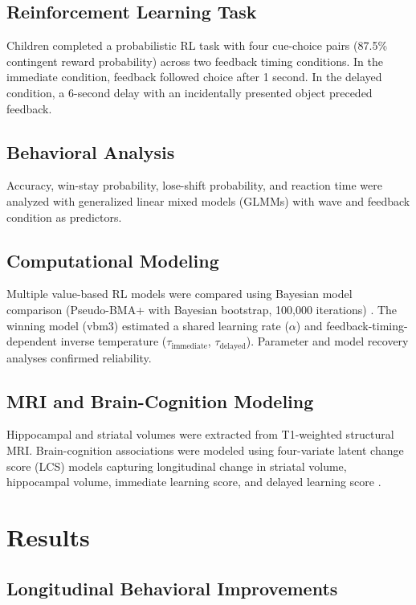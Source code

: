 \documentclass[12pt]{article}
\begin{document}
\subsection{Reinforcement Learning Task}

Children completed a probabilistic RL task with four cue-choice pairs (87.5\% contingent reward probability) across two feedback timing conditions. In the immediate condition, feedback followed choice after 1 second. In the delayed condition, a 6-second delay with an incidentally presented object preceded feedback.

\subsection{Behavioral Analysis}

Accuracy, win-stay probability, lose-shift probability, and reaction time were analyzed with generalized linear mixed models (GLMMs) with wave and feedback condition as predictors.

\subsection{Computational Modeling}

Multiple value-based RL models were compared using Bayesian model comparison (Pseudo-BMA+ with Bayesian bootstrap, 100,000 iterations) \citep{yao2017pseudobma, daw2011trial}. The winning model (vbm3) estimated a shared learning rate ($\alpha$) and feedback-timing-dependent inverse temperature ($\tau_\text{immediate}$, $\tau_\text{delayed}$). Parameter and model recovery analyses confirmed reliability.

\subsection{MRI and Brain-Cognition Modeling}

Hippocampal and striatal volumes were extracted from T1-weighted structural MRI. Brain-cognition associations were modeled using four-variate latent change score (LCS) models capturing longitudinal change in striatal volume, hippocampal volume, immediate learning score, and delayed learning score \citep{mcewen2021latent}.

\section{Results}

\subsection{Longitudinal Behavioral Improvements}
\end{document}
